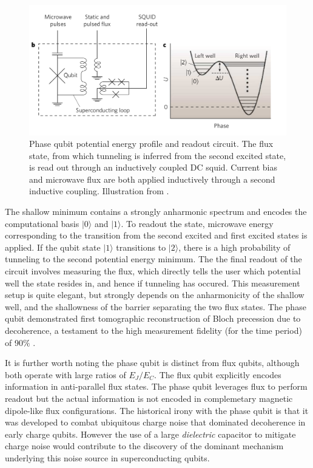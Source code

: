 \documentclass[%
 reprint,
showpacs,
 amsmath,amssymb,
 aps,
longbibliography,
]{revtex4-1}
\begin{document}
\begin{figure}[h!]
  \includegraphics[width=\linewidth]{phase_qubit.png}
  \caption{Phase qubit potential energy profile and readout circuit. The flux state, from which tunneling is inferred from the second excited state, is read out through an inductively coupled DC squid. Current bias and microwave flux are both applied inductively through a second inductive coupling. Illustration from \cite{Clarke}.}
  \label{fig:phasequbit}
\end{figure}
 The shallow minimum contains a strongly anharmonic spectrum and encodes the computational basis $|0\rangle$ and $|1\rangle$. To readout the state, microwave energy corresponding to the transition from the second excited and first excited states is applied. If the qubit state $|1\rangle$ transitions to $|2\rangle$, there is a high probability of tunneling to the second potential energy minimum. The the final readout of the circuit involves measuring the flux, which directly tells the user which potential well the state resides in, and hence if tunneling has occured. This measurement setup is quite elegant, but strongly depends on the anharmonicity of the shallow well, and the shallowness of the barrier separating the two flux states. The phase qubit demonstrated first tomographic reconstruction of Bloch precession due to decoherence, a testament to the high measurement fidelity (for the time period) of 90$\%$ \cite{TLS_phasequbit}. 

It is further worth noting the phase qubit is distinct from flux qubits, although both operate with large ratios of $E_J/E_C$. The flux qubit explicitly encodes information in anti-parallel flux states. The phase qubit leverages flux to perform readout but the actual information is not encoded in complemetary magnetic dipole-like flux configurations. The historical irony with the phase qubit is that it was developed to combat ubiquitous charge noise that dominated decoherence in early charge qubits. However the use of a large \textit{dielectric} capacitor to mitigate charge noise would contribute to the discovery of the dominant mechanism underlying this noise source in superconducting qubits.
\end{document}
